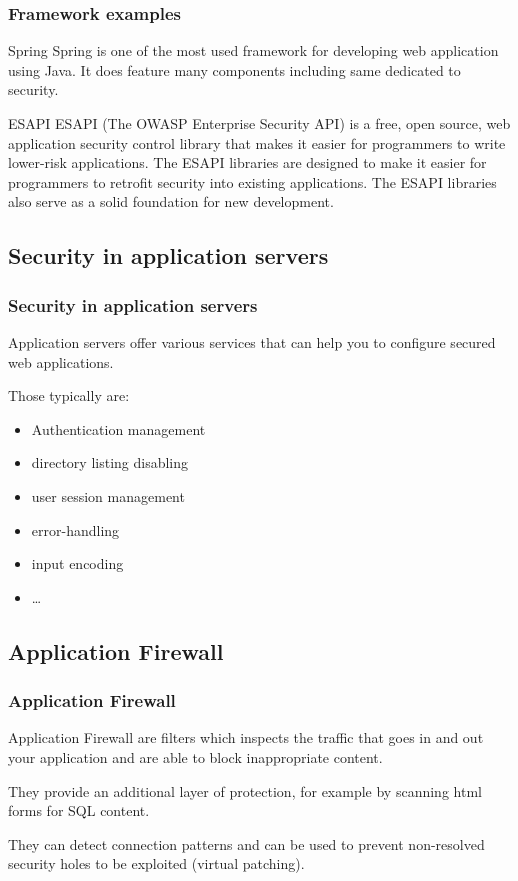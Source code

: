 \begin{frame}
\frametitle{Framework examples}

\begin{block}{Spring}
Spring is one of the most used framework for developing web
application using Java. It does feature many components including same
dedicated to security.
\end{block}

\begin{block}{ESAPI}
ESAPI (The OWASP Enterprise Security API) is a free, open source, web
application security control library that makes it easier for
programmers to write lower-risk applications. The ESAPI libraries are
designed to make it easier for programmers to retrofit security into
existing applications. The ESAPI libraries also serve as a solid
foundation for new development.
\end{block}

\end{frame}

\subsection{Security in application servers}
\begin{frame}
\frametitle{Security in application servers}
Application servers offer various services that can help you to configure
secured web applications.

Those typically are:
\begin{itemize}
\item Authentication management
\item directory listing disabling
\item user session management
\item error-handling
\item input encoding
\item \ldots
\end{itemize}
\end{frame}

\subsection{Application Firewall}
\begin{frame}
\frametitle{Application Firewall}
Application Firewall are filters which inspects the traffic that goes in and out your application and are able to block inappropriate content.

They provide an additional layer of protection, for example by scanning html forms for SQL content.

They can detect connection patterns and can be used to prevent non-resolved security holes to be exploited (virtual patching). 
\end{frame}


